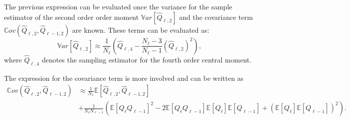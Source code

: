 The previous expression can be evaluated once the variance for the sample estimator of the second order order moment $\mathbb{V}ar\left[ \hat{Q}_{\ell,2} \right]$ and the covariance term $\mathbb{C}ov\left( \hat{Q}_{\ell,2},\hat{Q}_{\ell-1,2} \right)$ are known. These terms can be evaluated as:
\begin{equation}
 \mathbb{V}ar\left[ \hat{Q}_{\ell,2} \right] \approx \frac{1}{N_\ell} \left( \hat{Q}_{\ell,4} - \frac{N_\ell-3}{N_\ell-1} \left(\hat{Q}_{\ell,2}\right)^2 \right),
\end{equation}
where $\hat{Q}_{\ell,4}$ denotes the sampling estimator for the fourth order central moment.

The expression for the covariance term is more involved and can be written as
\begin{equation}
\begin{split}
 \mathbb{C}ov\left( \hat{Q}_{\ell,2},\hat{Q}_{\ell-1,2} \right) &\approx \frac{1}{N_\ell} \mathbb{E}\left[ \hat{Q}_{\ell,2},\hat{Q}_{\ell-1,2} \right] \\
                                                                      &+ \frac{1}{N_\ell N_{\ell-1}} \left( \mathbb{E}\left[ Q_\ell Q_{\ell-1} \right]^2
                                                                      - 2  \mathbb{E}\left[ Q_\ell Q_{\ell-1} \right] \mathbb{E}\left[ Q_\ell \right] \mathbb{E}\left[Q_{\ell-1} \right] + \left( \mathbb{E}\left[ Q_\ell \right] \mathbb{E}\left[Q_{\ell-1} \right] \right)^2
                                                                      \right).
\end{split}
\end{equation}

